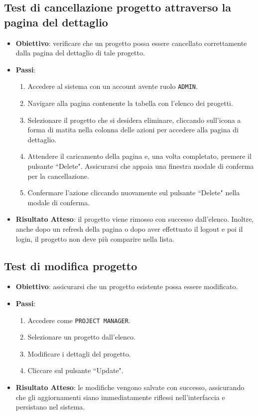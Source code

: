 \documentclass[target=bach,aauheader=,style=]{thud}
\begin{document}
\subsection{Test di cancellazione progetto attraverso la pagina del dettaglio}
\begin{itemize}
    \item \textbf{Obiettivo}: verificare che un progetto possa essere cancellato correttamente dalla pagina del dettaglio di tale progetto.
    \item \textbf{Passi}:
    \begin{enumerate}
        \item Accedere al sistema con un account avente ruolo \texttt{ADMIN}.
        \item Navigare alla pagina contenente la tabella con l'elenco dei progetti.
        \item Selezionare il progetto che si desidera eliminare, cliccando sull'icona a forma di matita nella colonna delle azioni per accedere alla pagina di dettaglio.
        \item Attendere il caricamento della pagina e, una volta completato, premere il pulsante ``Delete". Assicurarsi che appaia una finestra modale di conferma per la cancellazione.
        \item Confermare l'azione cliccando nuovamente sul pulsante ``Delete" nella modale di conferma.
    \end{enumerate}
    \item \textbf{Risultato Atteso}: il progetto viene rimosso con successo dall'elenco. Inoltre, anche dopo un refresh della pagina o dopo aver effettuato il logout e poi il login, il progetto non deve più comparire nella lista.
\end{itemize}


\subsection{Test di modifica progetto}
\begin{itemize}
    \item \textbf{Obiettivo}: assicurarsi che un progetto esistente possa essere modificato.
    \item \textbf{Passi}:
    \begin{enumerate}
        \item Accedere come \texttt{PROJECT MANAGER}.
        \item Selezionare un progetto dall'elenco.
        \item Modificare i dettagli del progetto.
        \item Cliccare sul pulsante ``Update".
    \end{enumerate}
    \item \textbf{Risultato Atteso}: le modifiche vengono salvate con successo, assicurando che gli aggiornamenti siano immediatamente riflessi nell'interfaccia e persistano nel sistema.
\end{itemize}
\end{document}
